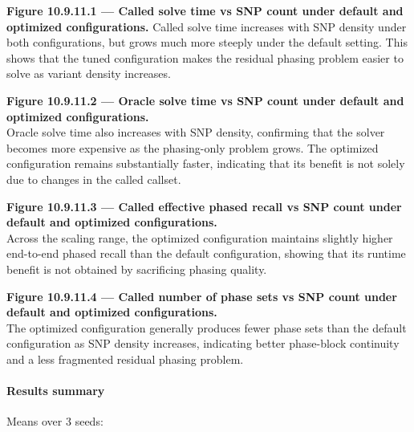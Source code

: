 \documentclass[
]{article}
\begin{document}
\textbf{Figure 10.9.11.1 --- Called solve time vs SNP count under
default and optimized configurations.} Called solve time increases with
SNP density under both configurations, but grows much more steeply under
the default setting. This shows that the tuned configuration makes the
residual phasing problem easier to solve as variant density increases.

\textbf{Figure 10.9.11.2 --- Oracle solve time vs SNP count under
default and optimized configurations.}\\
Oracle solve time also increases with SNP density, confirming that the
solver becomes more expensive as the phasing-only problem grows. The
optimized configuration remains substantially faster, indicating that
its benefit is not solely due to changes in the called callset.

\textbf{Figure 10.9.11.3 --- Called effective phased recall vs SNP count
under default and optimized configurations.}\\
Across the scaling range, the optimized configuration maintains slightly
higher end-to-end phased recall than the default configuration, showing
that its runtime benefit is not obtained by sacrificing phasing quality.

\textbf{Figure 10.9.11.4 --- Called number of phase sets vs SNP count
under default and optimized configurations.}\\
The optimized configuration generally produces fewer phase sets than the
default configuration as SNP density increases, indicating better
phase-block continuity and a less fragmented residual phasing problem.

\paragraph{Results summary}\label{results-summary-10}

Means over 3 seeds:
\end{document}
